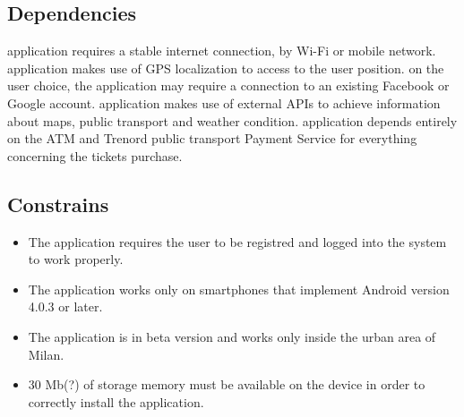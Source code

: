 \subsection{Dependencies}
\begin{itemize}
	\The application requires a stable internet connection, by Wi-Fi or mobile network.
	\The application makes use of GPS localization to access to the user position.
	\Based on the user choice, the application may require a connection to an existing Facebook or Google account.
	\The application makes use of external APIs to achieve information about maps, public transport and weather condition.
	\The application depends entirely on the ATM and Trenord public transport Payment Service for everything concerning the tickets purchase.
\end{itemize}
\subsection{Constrains}
\begin{itemize}
	\item The application requires the user to be registred and logged into the system to work properly.
	\item The application works only on smartphones that implement Android version 4.0.3 or later.
	\item The application is in beta version and works only inside the urban area of Milan.
	\item 30 Mb(?) of storage memory must be available on the device in order to correctly install the application.
\end{itemize}


